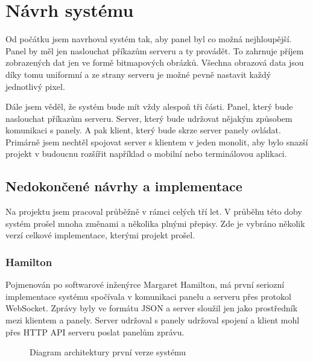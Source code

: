 \chapter{Návrh systému}

Od počátku jsem navrhoval systém tak, aby panel byl co možná nejhloupější. Panel by měl jen naslouchat příkazům serveru a ty provádět. To zahrnuje příjem zobrazených dat jen ve formě bitmapových obrázků. Všechna obrazová data jsou díky tomu uniformní a ze strany serveru je možné pevně nastavit každý jednotlivý pixel.

Dále jsem věděl, že systém bude mít vždy alespoň tři části. Panel, který bude naslouchat příkazům serveru. Server, který bude udržovat nějakým způsobem komunikaci s panely. A pak klient, který bude skrze server panely ovládat. Primárně jsem nechtěl spojovat server s klientem v jeden monolit, aby bylo snazší projekt v budoucnu rozšířit například o mobilní nebo terminálovou aplikaci.

\section{Nedokončené návrhy a implementace}
Na projektu jsem pracoval průběžně v rámci celých tří let. V průběhu této doby systém prošel mnoha změnami a několika plnými přepisy. Zde je vybráno několik verzí celkové implementace, kterými projekt prošel.

\subsection{Hamilton}
Pojmenován po softwarové inženýrce Margaret Hamilton, má první seriozní implementace systému spočívala v komunikaci panelu a serveru přes protokol WebSocket. Zprávy byly ve formátu JSON a server sloužil jen jako prostředník mezi klientem a panely. Server udržoval s panely udržoval spojení a klient mohl přes HTTP API serveru poslat panelům zprávu.

\begin{figure}[h]
    \centering
    \caption{Diagram architektury první verze systému}
    \label{fig:first-system-architecture}
\end{figure}

